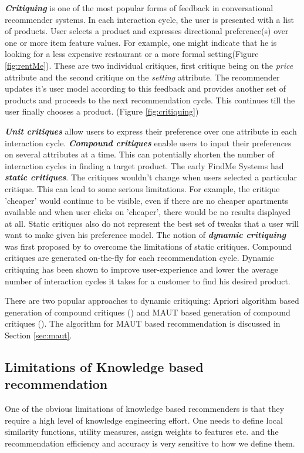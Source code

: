 \textit{\textbf{Critiquing}} is one of the most popular forms of feedback in conversational recommender systems. In each interaction cycle, the user is presented with a list of products.
User selects a product and expresses directional preference(s) over one or more item feature values. 
For example, one might indicate that he is looking for a less expensive restaurant or a more formal setting(Figure \ref{fig:rentMe}). These are two individual critiques, first critique being on the \textit{price} attribute and the second critique on the \textit{setting} attribute. 
The recommender updates it's user model according to this feedback and provides another set of products and proceeds to the next recommendation cycle. This continues till the user finally chooses a product. (Figure \ref{fig:critiquing})

\textit{\textbf{Unit critiques}} allow users to express their preference over one attribute in each interaction cycle. \textit{\textbf{Compound critiques}} enable users to input their preferences on several attributes at a time. This can potentially shorten the number of interaction cycles in finding a target product.
The early FindMe Systems \cite{burkeEarlierSystems} had \textit{\textbf{static critiques}}. The critiques wouldn't change when users selected a particular critique. 
This can lead to some serious limitations.
For example, the critique 'cheaper' would continue to be visible, even if there are no cheaper apartments available and when user clicks on 'cheaper', there would be no results displayed at all.
Static critiques also do not represent the best set of tweaks that a user will want to make given his preference model.
The notion of \textit{\textbf{dynamic critiquing}} was first proposed by \cite{mccarthy2004dynamic} to overcome the limitations of static critiques.
Compound critiques are generated on-the-fly for each recommendation cycle. Dynamic critiquing has been shown to improve user-experience and lower the average number of interaction cycles it takes for a customer to find his desired product.

There are two popular approaches to dynamic critiquing: Apriori algorithm based generation of compound critiques (\cite{mccarthy2004dynamic}) and MAUT based generation of compound critiques (\cite{mautPaper}). 
The algorithm for MAUT based recommendation is discussed in Section \ref{sec:maut}.

\subsection{Limitations of Knowledge based recommendation}
One of the obvious limitations of knowledge based recommenders is that they require a high level of knowledge engineering effort.
One needs to define local similarity functions, utility measures, assign weights to features etc. and the recommendation efficiency and accuracy is very sensitive to how we define them.

